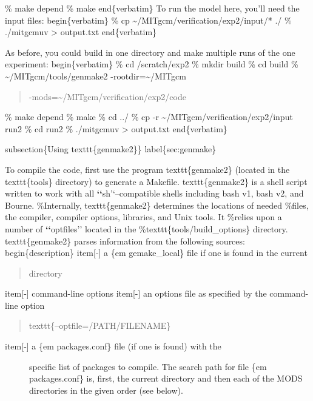 \documentclass[letterpaper,10pt,english]{sphinxmanual}
\begin{document}
\% make depend
\% make
end\{verbatim\}
To run the model here, you'll need the input files:
begin\{verbatim\}
\% cp \textasciitilde{}/MITgcm/verification/exp2/input/* ./
\% ./mitgcmuv \textgreater{} output.txt
end\{verbatim\}

As before, you could build in one directory and make multiple runs of
the one experiment:
begin\{verbatim\}
\% cd /scratch/exp2
\% mkdir build
\% cd build
\% \textasciitilde{}/MITgcm/tools/genmake2 -rootdir=\textasciitilde{}/MITgcm 
\begin{quote}

-mods=\textasciitilde{}/MITgcm/verification/exp2/code
\end{quote}

\% make depend
\% make
\% cd ../
\% cp -r \textasciitilde{}/MITgcm/verification/exp2/input run2
\% cd run2
\% ./mitgcmuv \textgreater{} output.txt
end\{verbatim\}

subsection\{Using texttt\{genmake2\}\}
label\{sec:genmake\}

To compile the code, first use the program texttt\{genmake2\} (located
in the texttt\{tools\} directory) to generate a Makefile.
texttt\{genmake2\} is a shell script written to work with all
{\color{red}\bfseries{}{}`{}`}sh'`--compatible shells including bash v1, bash v2, and Bourne.
\%Internally, texttt\{genmake2\} determines the locations of needed
\%files, the compiler, compiler options, libraries, and Unix tools.  It
\%relies upon a number of {\color{red}\bfseries{}{}`{}`}optfiles'' located in the
\%texttt\{tools/build\_options\} directory.
texttt\{genmake2\} parses information from the following sources:
begin\{description\}
item{[}-{]} a \{em gemake\_local\} file if one is found in the current
\begin{quote}

directory
\end{quote}

item{[}-{]} command-line options
item{[}-{]} an \sphinxquotedblleft{}options file\sphinxquotedblright{} as specified by the command-line option
\begin{quote}

texttt\{--optfile=/PATH/FILENAME\}
\end{quote}
\begin{description}
\item[{item{[}-{]} a \{em packages.conf\} file (if one is found) with the}] \leavevmode
specific list of packages to compile. The search path for
file \{em packages.conf\} is, first, the current directory and
then each of the \sphinxquotedblleft{}MODS\sphinxquotedblright{} directories in the given order (see below).

\end{description}
\end{document}
